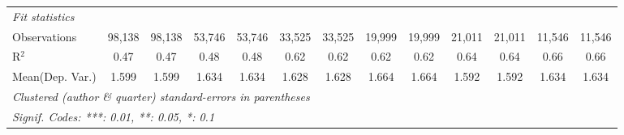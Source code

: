 \begin{tabular}{lcccccccccccc}
   \midrule
   \emph{Fit statistics}\\
   Observations                             & 98,138        & 98,138        & 53,746        & 53,746       & 33,525        & 33,525        & 19,999         & 19,999        & 21,011  & 21,011       & 11,546       & 11,546\\  
   R$^2$                                    & 0.47          & 0.47          & 0.48          & 0.48         & 0.62          & 0.62          & 0.62           & 0.62          & 0.64    & 0.64         & 0.66         & 0.66\\  
Mean(Dep. Var.) & 1.599 & 1.599 & 1.634 & 1.634 & 1.628 & 1.628 & 1.664 & 1.664 & 1.592 & 1.592 & 1.634 & 1.634 \\
   \midrule \midrule
   \multicolumn{13}{l}{\emph{Clustered (author \& quarter) standard-errors in parentheses}}\\
   \multicolumn{13}{l}{\emph{Signif. Codes: ***: 0.01, **: 0.05, *: 0.1}}\\
\end{tabular}
\par\endgroup
